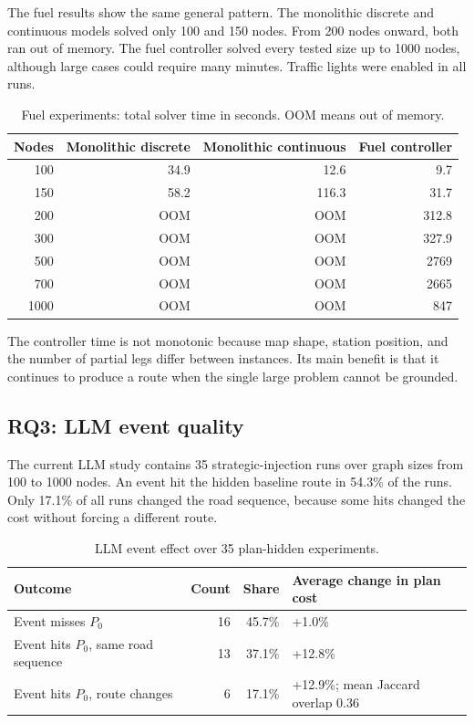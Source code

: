 \documentclass[10pt]{article}
\begin{document}
The fuel results show the same general pattern. The monolithic discrete and
continuous models solved only 100 and 150 nodes. From 200 nodes onward, both ran
out of memory. The fuel controller solved every tested size up to 1000 nodes,
although large cases could require many minutes. Traffic lights were enabled in
all runs.

\begin{table}[H]
\centering
\caption{Fuel experiments: total solver time in seconds. OOM means out of memory.}
\label{tab:fuel-results}
\scriptsize
\begin{tabular}{@{}r r r r@{}}
\toprule
Nodes & Monolithic discrete & Monolithic continuous & Fuel controller \\
\midrule
100  & 34.9 & 12.6 & 9.7 \\
150  & 58.2 & 116.3 & 31.7 \\
200  & OOM & OOM & 312.8 \\
300  & OOM & OOM & 327.9 \\
500  & OOM & OOM & 2769 \\
700  & OOM & OOM & 2665 \\
1000 & OOM & OOM & 847 \\
\bottomrule
\end{tabular}
\end{table}

The controller time is not monotonic because map shape, station position, and
the number of partial legs differ between instances. Its main benefit is that it
continues to produce a route when the single large problem cannot be grounded.

\subsection{RQ3: LLM event quality}
The current LLM study contains 35 strategic-injection runs over graph sizes from
100 to 1000 nodes. An event hit the hidden baseline route in 54.3\% of the runs.
Only 17.1\% of all runs changed the road sequence, because some hits changed the
cost without forcing a different route.

\begin{table}[H]
\centering
\caption{LLM event effect over 35 plan-hidden experiments.}
\label{tab:llm-results}
\scriptsize
\begin{tabularx}{\linewidth}{@{}Y r r Y@{}}
\toprule
Outcome & Count & Share & Average change in plan cost \\
\midrule
Event misses $P_0$ & 16 & 45.7\% & +1.0\% \\
Event hits $P_0$, same road sequence & 13 & 37.1\% & +12.8\% \\
Event hits $P_0$, route changes & 6 & 17.1\% & +12.9\%; mean Jaccard overlap $0.36$ \\
\bottomrule
\end{tabularx}
\end{table}
\end{document}
